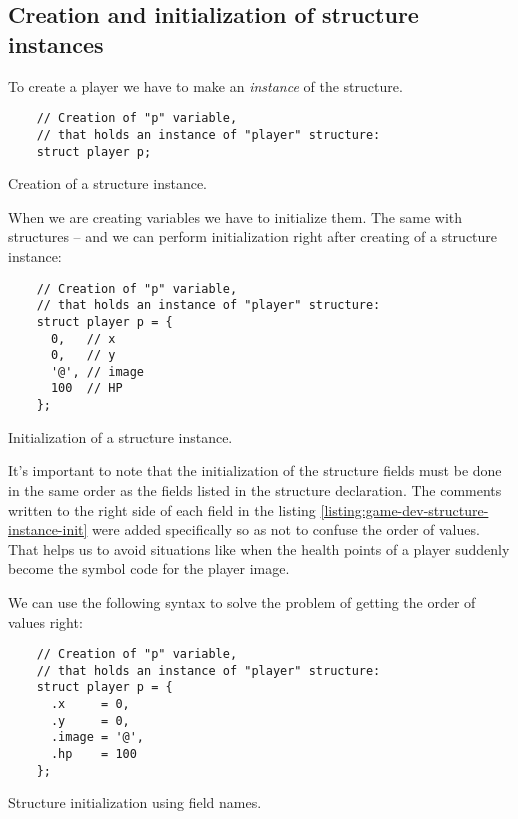 \documentclass[../sparc.tex]{subfiles}
\begin{document}
\subsection{Creation and initialization of structure instances}

To create a player we have to make an \emph{instance} of the structure.

\begin{listing}[H]
  \begin{verbatim}
    // Creation of "p" variable,
    // that holds an instance of "player" structure:
    struct player p;
  \end{verbatim}
  \caption{Creation of a structure instance.}
  \label{listing:game-dev-structure-instance}
\end{listing}

When we are creating variables we have to initialize them.  The same with
structures -- and we can perform initialization right after creating of a
structure instance:

\begin{listing}[H]
  \begin{verbatim}
    // Creation of "p" variable,
    // that holds an instance of "player" structure:
    struct player p = {
      0,   // x
      0,   // y
      '@', // image
      100  // HP
    };
  \end{verbatim}
  \caption{Initialization of a structure instance.}
  \label{listing:game-dev-structure-instance-init}
\end{listing}

It's important to note that the initialization of the structure fields must be
done in the same order as the fields listed in the structure declaration.  The
comments written to the right side of each field in the listing
\ref{listing:game-dev-structure-instance-init} were added specifically so as not
to confuse the order of values.  That helps us to avoid situations like when the
health points of a player suddenly become the symbol code for the player image.

We can use the following syntax to solve the problem of getting the order of
values right:

\begin{listing}[H]
  \begin{verbatim}
    // Creation of "p" variable,
    // that holds an instance of "player" structure:
    struct player p = {
      .x     = 0,
      .y     = 0,
      .image = '@',
      .hp    = 100
    };
  \end{verbatim}
  \caption{Structure initialization using field names.}
  \label{listing:game-dev-structure-instance-init-names}
\end{listing}
\end{document}
